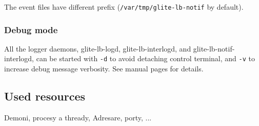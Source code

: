 The event files have different prefix (\verb'/var/tmp/glite-lb-notif' by default).

\subsubsection{Debug mode}

All the logger daemons, \ie glite-lb-logd, glite-lb-interlogd, and
glite-lb-notif-interlogd, can be started with \verb'-d' 
to avoid detaching control terminal, and \verb'-v' to increase 
debug message verbosity.
See manual pages for details.

\subsection{Used resources}

Demoni, procesy a thready, Adresare, porty, ...
